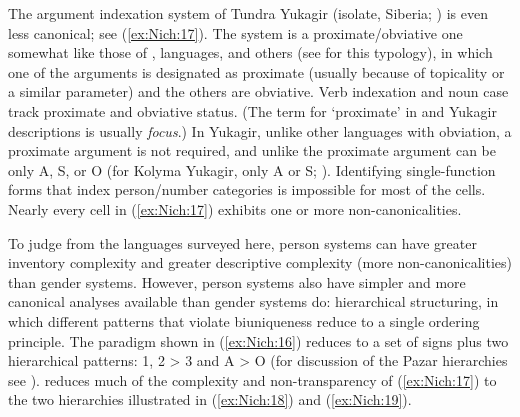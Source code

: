 \documentclass[output=collectionpaper]{langsci/langscibook}
\begin{document}
The argument indexation system of Tundra Yukagir (isolate, Siberia; \citealt{Maslov2003}) is even less canonical; see (\ref{ex:Nich:17}). The system is a proximate/obviative one somewhat like those of ,  languages, and others (see \citealt{Bickel2011} for this typology), in which one of the arguments is designated as proximate (usually because of topicality or a similar parameter) and the others are obviative. Verb indexation and noun case track proximate and obviative status. (The term for `proximate' in  and Yukagir descriptions is usually \textit{focus}.) In Yukagir, unlike other languages with obviation, a proximate argument is not required, and unlike  the proximate argument can be only A, S, or O (for Kolyma Yukagir, only A or S; \citealt{Maslov2003a}). Identifying single-function forms that index person/number categories is impossible for most of the cells. Nearly every cell in (\ref{ex:Nich:17}) exhibits one or more non-canonicalities.

%

To judge from the languages surveyed here, person systems can have greater inventory complexity and greater descriptive complexity (more non-canonical\-i\-ties) than gender systems. However, person systems also have simpler and more canonical analyses available than gender systems do: hierarchical structuring, in which different patterns that violate biuniqueness reduce to a single ordering principle. The  paradigm shown in (\ref{ex:Nich:16}) reduces to a set of signs plus two hierarchical patterns: 1, 2 > 3 and A > O (for discussion of the Pazar  hierarchies see \citealt[48]{Oeztuerk2011}). \citet[17, 20]{Maslov2003} reduces much of the complexity and non-transparency of (\ref{ex:Nich:17}) to the two hierarchies illustrated in (\ref{ex:Nich:18}) and (\ref{ex:Nich:19}).
\end{document}
